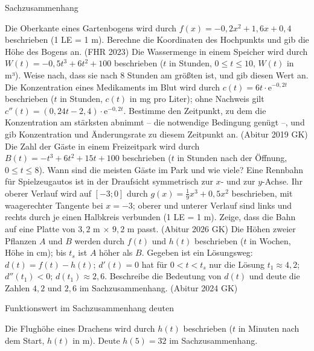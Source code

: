 \begin{aufgabe}{Sachzusammenhang}
\begin{teile}
\begin{ksys}[xmin=0,xmax=20,ymin=0,ymax=50,xstep=5,ystep=5,xlabel=t in h,ylabel=h in cm,ablesen]  \end{ksys}
\teil Die Oberkante eines Gartenbogens wird durch $f(x) = -0{,}2x^2 + 1{,}6x + 0{,}4$ beschrieben (1 LE = 1 m). Berechne die Koordinaten des Hochpunkts und gib die Höhe des Bogens an. \hfill (FHR 2023)
\teil Die Wassermenge in einem Speicher wird durch $W(t) = -0{,}5t^3 + 6t^2 + 100$ beschrieben ($t$ in Stunden, $0 \le t \le 10$, $W(t)$ in m³). Weise nach, dass sie nach $8$ Stunden am größten ist, und gib diesen Wert an.
\teil Die Konzentration eines Medikaments im Blut wird durch $c(t) = 6t \cdot \mathrm{e}^{-0{,}2t}$ beschrieben ($t$ in Stunden, $c(t)$ in mg pro Liter); ohne Nachweis gilt $c''(t) = (0{,}24t - 2{,}4) \cdot \mathrm{e}^{-0{,}2t}$. Bestimme den Zeitpunkt, zu dem die Konzentration am stärksten abnimmt – die notwendige Bedingung genügt –, und gib Konzentration und Änderungsrate zu diesem Zeitpunkt an. \hfill (Abitur 2019 GK)
\teil Die Zahl der Gäste in einem Freizeitpark wird durch $B(t) = -t^3 + 6t^2 + 15t + 100$ beschrieben ($t$ in Stunden nach der Öffnung, $0 \le t \le 8$). Wann sind die meisten Gäste im Park und wie viele?
\teil Eine Rennbahn für Spielzeugautos ist in der Draufsicht symmetrisch zur $x$- und zur $y$-Achse. Ihr oberer Verlauf wird auf $[-3; 0]$ durch $g(x) = \frac{1}{9}x^3 + 0{,}5x^2$ beschrieben, mit waagerechter Tangente bei $x = -3$; oberer und unterer Verlauf sind links und rechts durch je einen Halbkreis verbunden (1 LE = 1 m). Zeige, dass die Bahn auf eine Platte von $3{,}2$ m $\times$ $9{,}2$ m passt. \hfill (Abitur 2026 GK)
\teil Die Höhen zweier Pflanzen $A$ und $B$ werden durch $f(t)$ und $h(t)$ beschrieben ($t$ in Wochen, Höhe in cm); bis $t_s$ ist $A$ höher als $B$. Gegeben ist ein Lösungsweg: $d(t) = f(t) - h(t)$; $d'(t) = 0$ hat für $0 < t < t_s$ nur die Lösung $t_1 \approx 4{,}2$; $d''(t_1) < 0$; $d(t_1) \approx 2{,}6$. Beschreibe die Bedeutung von $d(t)$ und deute die Zahlen $4{,}2$ und $2{,}6$ im Sachzusammenhang. \hfill (Abitur 2024 GK)
\end{teile}
\end{aufgabe}

\begin{aufgabe}{Funktionswert im Sachzusammenhang deuten}
\begin{teile}
\teil Die Flughöhe eines Drachens wird durch $h(t)$ beschrieben ($t$ in Minuten nach dem Start, $h(t)$ in m). Deute $h(5) = 32$ im Sachzusammenhang.
\end{teile}
\end{aufgabe}

